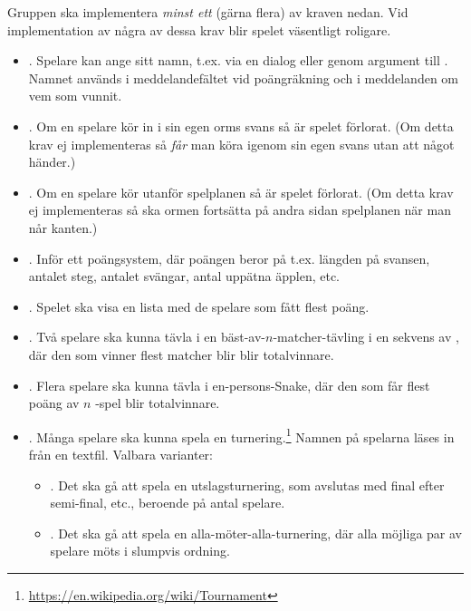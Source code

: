 Gruppen ska implementera \emph{minst ett} (gärna flera) av kraven nedan. Vid implementation av några av dessa krav blir spelet väsentligt roligare.
\begin{itemize}[nosep, label={$\square$}]

\item \textbf{}. Spelare kan ange sitt namn, t.ex. via en dialog eller genom argument till . Namnet används i meddelandefältet vid poängräkning och i meddelanden om vem som vunnit.

\item \textbf{}. Om en spelare kör in i sin egen orms svans så är spelet förlorat. (Om detta krav ej implementeras så \emph{får} man köra igenom sin egen svans utan att något händer.)

\item \textbf{}. Om en spelare kör utanför spelplanen så är spelet förlorat. (Om detta krav ej implementeras så ska ormen fortsätta på andra sidan spelplanen när man når kanten.)

\item \textbf{}. Inför ett poängsystem, där poängen beror på t.ex. längden på svansen, antalet steg, antalet svängar, antal uppätna äpplen, etc.

\item \textbf{}. Spelet ska visa en lista med de spelare som fått flest poäng.

\item \textbf{}. Två spelare ska kunna tävla i en bäst-av-$n$-matcher-tävling i en sekvens av , där den som vinner flest matcher blir blir totalvinnare.

\item \textbf{}. Flera spelare ska kunna tävla i en-persons-Snake, där den som får flest poäng av $n$ -spel blir totalvinnare.

\item \textbf{}. Många spelare ska kunna spela en turnering.\footnote{\url{https://en.wikipedia.org/wiki/Tournament}} Namnen på spelarna läses in från en textfil. Valbara varianter:

\begin{itemize}[nosep, label={$\square$}]
\item \textbf{}. Det ska gå att spela en utslagsturnering, som avslutas med final efter semi-final, etc., beroende på antal spelare.
\item \textbf{}. Det ska gå att spela en alla-möter-alla-turnering, där alla möjliga par av spelare möts i slumpvis ordning.
\end{itemize}

\end{itemize}


